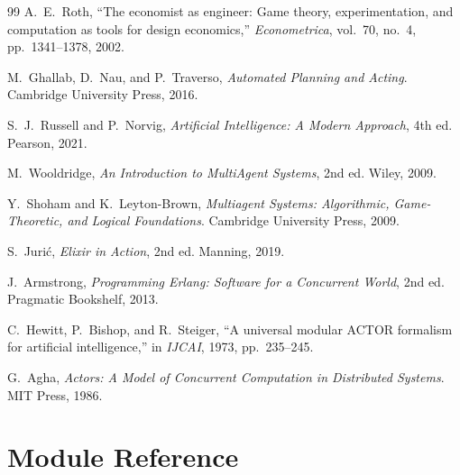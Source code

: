\documentclass[12pt,a4paper]{article}
\theoremstyle{plain}
\theoremstyle{definition}
\begin{document}
\begin{thebibliography}{99}
A.~E.~Roth, ``The economist as engineer: Game theory, experimentation, and computation as tools for design economics,'' \emph{Econometrica}, vol.~70, no.~4, pp.~1341--1378, 2002.

M.~Ghallab, D.~Nau, and P.~Traverso, \emph{Automated Planning and Acting}. Cambridge University Press, 2016.

S.~J.~Russell and P.~Norvig, \emph{Artificial Intelligence: A Modern Approach}, 4th ed. Pearson, 2021.

M.~Wooldridge, \emph{An Introduction to MultiAgent Systems}, 2nd ed. Wiley, 2009.

Y.~Shoham and K.~Leyton-Brown, \emph{Multiagent Systems: Algorithmic, Game-Theoretic, and Logical Foundations}. Cambridge University Press, 2009.

S.~Juri\'{c}, \emph{Elixir in Action}, 2nd ed. Manning, 2019.

J.~Armstrong, \emph{Programming Erlang: Software for a Concurrent World}, 2nd ed. Pragmatic Bookshelf, 2013.

C.~Hewitt, P.~Bishop, and R.~Steiger, ``A universal modular ACTOR formalism for artificial intelligence,'' in \emph{IJCAI}, 1973, pp.~235--245.

G.~Agha, \emph{Actors: A Model of Concurrent Computation in Distributed Systems}. MIT Press, 1986.

\end{thebibliography}

\appendix

\section{Module Reference}\label{app:module-ref}
\end{document}
